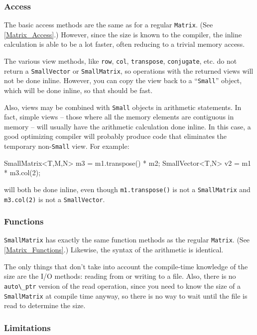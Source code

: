 \documentclass[twoside,letterpaper,11pt]{article}
\renewcommand{\tt}[1]{{\lstinline {#1}}}
\begin{document}
\subsubsection{Access}
\label{SmallMatrix_Access}

The basic access methods are the same as for a regular \tt{Matrix}.
(See \ref{Matrix_Access}.)
However, since the size is known to the compiler, the inline calculation is able
to be a lot faster, often reducing to a trivial memory access.

The various view methods, like \tt{row}, \tt{col}, \tt{transpose}, \tt{conjugate}, etc. 
do not return a \tt{SmallVector} or \tt{SmallMatrix}, so operations 
with the returned views will not be done inline.
However, you can copy the view back to a ``\tt{Small}'' object, which will be done 
inline, so that should be fast.

Also, views may be combined with \tt{Small} objects in arithmetic statements.
In fact, simple views -- those where all the memory 
elements are contiguous in memory -- will usually have the arithmetic calculation
done inline.
In this case, a good optimizing compiler will probably produce code that 
eliminates the temporary
non-\tt{Small} view.  For example:
\begin{tmvcode}
SmallMatrix<T,M,N> m3 = m1.transpose() * m2;
SmallVector<T,N> v2 = m1 * m3.col(2);
\end{tmvcode}
will both be done inline, even though \tt{m1.transpose()} is not a \tt{SmallMatrix} and
\tt{m3.col(2)} is not a \tt{SmallVector}.

\subsubsection{Functions}
\label{SmallMatrix_Functions}

\tt{SmallMatrix} has exactly the same
function methods as the regular \tt{Matrix}.  
(See \ref{Matrix_Functions}.)
Likewise, the syntax of the
arithmetic is identical. 

The only things that don't take into account the 
compile-time knowledge of the size are the I/O methods:
reading from or writing to a file.
Also, there is no \tt{auto\_ptr} 
version of the read operation, since you need to know the 
size of a \tt{SmallMatrix} at compile time anyway, 
so there is no way to wait until the file is read to determine the size.

\subsubsection{Limitations}
\label{SmallMatrix_Limitations}
\end{document}
